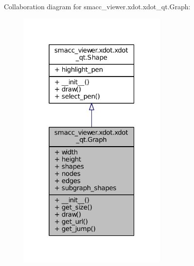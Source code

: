 Collaboration diagram for smacc\+\_\+viewer.\+xdot.\+xdot\+\_\+qt.\+Graph\+:
\nopagebreak
\begin{figure}[H]
\begin{center}
\leavevmode
\includegraphics[width=211pt]{classsmacc__viewer_1_1xdot_1_1xdot__qt_1_1Graph__coll__graph}
\end{center}
\end{figure}
